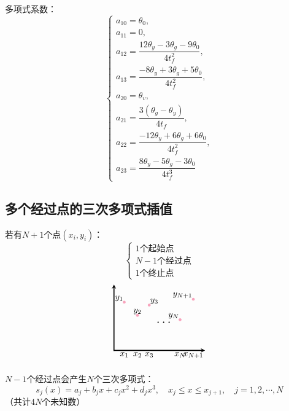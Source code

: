 多项式系数：
$$
\begin{cases}
a_{10} = \theta_0,\\
a_{11} = 0,\\
a_{12} = \dfrac{12\theta_y - 3\theta_g - 9\theta_0}{4t_{f}^2},\\
a_{13} = \dfrac{-8\theta_y + 3\theta_g + 5\theta_0}{4t_{f}^2}, \\
a_{20} = \theta_v,\\
a_{21} = \dfrac{3(\theta_g - \theta_y)}{4t_f},\\
a_{22} = \dfrac{-12\theta_y + 6\theta_g + 6\theta_0}{4t_{f}^2},\\
a_{23} = \dfrac{8\theta_y - 5\theta_g - 3\theta_0}{4t_f^3}
\end{cases}
$$

\subsection{多个经过点的三次多项式插值}
若有$N+1$个点$(x_i, y_i)$：
$$
\begin{cases}
    1\text{个起始点} \\
    N-1\text{个经过点} \\
    1\text{个终止点}
\end{cases}
$$
$$
\begin{tikzpicture}[
    >=stealth,
    line cap=round,
    line join=round,
    scale=.6
]
\draw[->, very thick] (0,0) -- (6.2,0); %
\draw[->, very thick] (0,0) -- (0,4.5); %
\coordinate (p1) at (0.7, 3.3);
\coordinate (p2) at (1.6, 2.4);
\coordinate (p3) at (2.4, 3.1);
\coordinate (pN) at (4.5, 2.1);
\coordinate (pN1) at (5.4, 3.5);
\foreach \p in {p1, p2, p3, pN, pN1} {
    \fill[whusakura] (\p) circle (2.8pt);
}
\node[above left,  inner sep=1pt] at (p1) {$y_1$};
\node[above,       inner sep=1pt] at (p2) {$y_2$};
\node[above right, inner sep=1pt] at (p3) {$y_3$};
\node[above left,  inner sep=1pt] at (pN) {$y_N$};
\node[above left,  inner sep=1pt] at (pN1) {$y_{N+1}$};
\node[below, inner sep=2pt] at (0.7,0) {$x_1$};
\node[below, inner sep=2pt] at (1.6,0) {$x_2$};
\node[below, inner sep=2pt] at (2.4,0) {$x_3$};
\node[below, inner sep=2pt] at (4.5,0) {$x_N$};
\node[below, inner sep=2pt] at (5.4,0) {$x_{N+1}$};
\node at (3.45, 1.9) {\Large $\cdots$};
\end{tikzpicture}
$$

$N-1$个经过点会产生$N$个三次多项式：
$$
s_j(x) = a_j + b_j x + c_j x^2 + d_j x^3, \quad x_j \leq x \leq x_{j+1}, \quad j = 1, 2, \cdots, N
$$
（共计$4N$个未知数）

